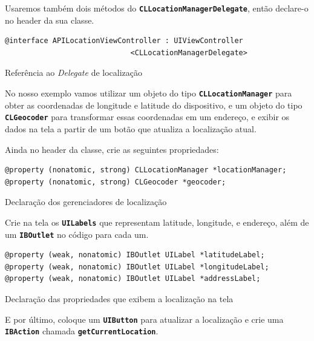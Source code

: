 \documentclass[a4paper,12pt,brazil,doubleside]{book}
\begin{document}
\begin{singlespace}
Usaremos também dois métodos do \texttt{\textbf{CLLocationManagerDelegate}}, então declare-o no header da sua classe.

\begin{listing}[H]
\begin{verbatim}
@interface APILocationViewController : UIViewController
                             <CLLocationManagerDelegate>
\end{verbatim}
\caption{Referência ao \emph{Delegate} de localização}
\end{listing}


No nosso exemplo vamos utilizar um objeto do tipo \texttt{\textbf{CLLocationManager}} para obter as coordenadas de longitude e latitude do dispositivo, e um objeto do tipo \texttt{\textbf{CLGeocoder}} para transformar essas coordenadas em um endereço, e exibir os dados na tela a partir de um botão que atualiza a localização atual.

Ainda no header da classe, crie as seguintes propriedades:

\begin{listing}[H]
\begin{verbatim}
@property (nonatomic, strong) CLLocationManager *locationManager;
@property (nonatomic, strong) CLGeocoder *geocoder;
\end{verbatim}
\caption{Declaração dos gerenciadores de localização}
\end{listing}


Crie na tela os \texttt{\textbf{UILabels}} que representam latitude, longitude, e endereço, além de um \texttt{\textbf{IBOutlet}} no código para cada um.

\begin{listing}[H]
\begin{verbatim}
@property (weak, nonatomic) IBOutlet UILabel *latitudeLabel;
@property (weak, nonatomic) IBOutlet UILabel *longitudeLabel;
@property (weak, nonatomic) IBOutlet UILabel *addressLabel;
\end{verbatim}
\caption{Declaração das propriedades que exibem a localização na tela}
\end{listing}


E por último, coloque um \texttt{\textbf{UIButton}} para atualizar a localização e crie uma \texttt{\textbf{IBAction}} chamada \texttt{\textbf{getCurrentLocation}}.


\end{singlespace}
\end{document}
